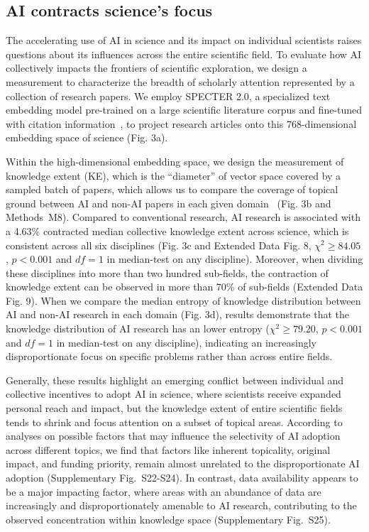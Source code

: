 \subsection*{AI contracts science’s focus}
The accelerating use of AI in science and its impact on individual scientists raises questions about its influences across the entire scientific field.
To evaluate how AI collectively impacts the frontiers of scientific exploration, we design a measurement to characterize the breadth of scholarly attention represented by a collection of research papers.
We employ SPECTER 2.0, a specialized text embedding model pre-trained on a large scientific literature corpus and fine-tuned with citation information~\supercite{DBLP:conf/emnlp/SinghDCDF23}, to project research articles onto this 768-dimensional embedding space of science (Fig. 3a).

Within the high-dimensional embedding space, we design the measurement of knowledge extent (KE), which is the “diameter” of vector space covered by a sampled batch of papers, which allows us to compare the coverage of topical ground between AI and non-AI papers in each given domain~\supercite{fortunato2018science,milojevic2015quantifying} (Fig. 3b and Methods~M8).
Compared to conventional research, AI research is associated with a 4.63\% contracted median collective knowledge extent across science, which is consistent across all six disciplines (Fig. 3c and Extended Data Fig. 8, $\chi^2\geq84.05$, $p<0.001$ and $df=1$ in median-test on any discipline).
Moreover, when dividing these disciplines into more than two hundred sub-fields, the contraction of knowledge extent can be observed in more than 70\% of sub-fields (Extended Data Fig. 9).
When we compare the median entropy of knowledge distribution between AI and non-AI research in each domain (Fig. 3d), results demonstrate that the knowledge distribution of AI research has an lower entropy ($\chi^2\geq79.20$, $p<0.001$ and $df=1$ in median-test on any discipline), indicating an increasingly disproportionate focus on specific problems rather than across entire fields.

Generally, these results highlight an emerging conflict between individual and collective incentives to adopt AI in science, where scientists receive expanded personal reach and impact, but the knowledge extent of entire scientific fields tends to shrink and focus attention on a subset of topical areas.
According to analyses on possible factors that may influence the selectivity of AI adoption across different topics, we find that factors like inherent topicality, original impact, and funding priority, remain almost unrelated to the disproportionate AI adoption (Supplementary Fig.~S22-S24).
In contrast, data availability appears to be a major impacting factor, where areas with an abundance of data are increasingly and disproportionately amenable to AI research, contributing to the observed concentration within knowledge space (Supplementary Fig.~S25).


